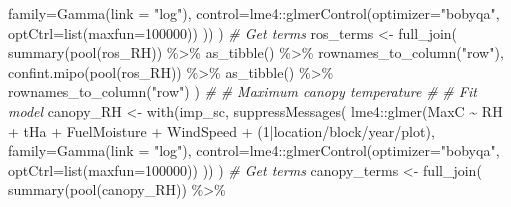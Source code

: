 \documentclass[
]{article}
\newenvironment{Shaded}{\begin{snugshade}}{\end{snugshade}}
\newcommand{\AttributeTok}[1]{\textcolor[rgb]{0.77,0.63,0.00}{#1}}
\newcommand{\CommentTok}[1]{\textcolor[rgb]{0.56,0.35,0.01}{\textit{#1}}}
\newcommand{\DecValTok}[1]{\textcolor[rgb]{0.00,0.00,0.81}{#1}}
\newcommand{\FunctionTok}[1]{\textcolor[rgb]{0.00,0.00,0.00}{#1}}
\newcommand{\NormalTok}[1]{#1}
\newcommand{\OtherTok}[1]{\textcolor[rgb]{0.56,0.35,0.01}{#1}}
\newcommand{\SpecialCharTok}[1]{\textcolor[rgb]{0.00,0.00,0.00}{#1}}
\newcommand{\StringTok}[1]{\textcolor[rgb]{0.31,0.60,0.02}{#1}}
\begin{document}
\begin{Shaded}
\begin{Highlighting}[]
                        \AttributeTok{family=}\FunctionTok{Gamma}\NormalTok{(}\AttributeTok{link =} \StringTok{"log"}\NormalTok{), }
                        \AttributeTok{control=}\NormalTok{lme4}\SpecialCharTok{::}\FunctionTok{glmerControl}\NormalTok{(}\AttributeTok{optimizer=}\StringTok{"bobyqa"}\NormalTok{, }
                                      \AttributeTok{optCtrl=}\FunctionTok{list}\NormalTok{(}\AttributeTok{maxfun=}\DecValTok{100000}\NormalTok{)) )) )}
  \CommentTok{\# Get terms}
\NormalTok{    ros\_terms }\OtherTok{\textless{}{-}} 
      \FunctionTok{full\_join}\NormalTok{(}
      \FunctionTok{summary}\NormalTok{(}\FunctionTok{pool}\NormalTok{(ros\_RH)) }\SpecialCharTok{\%\textgreater{}\%} 
        \FunctionTok{as\_tibble}\NormalTok{() }\SpecialCharTok{\%\textgreater{}\%}
        \FunctionTok{rownames\_to\_column}\NormalTok{(}\StringTok{"row"}\NormalTok{), }
      \FunctionTok{confint.mipo}\NormalTok{(}\FunctionTok{pool}\NormalTok{(ros\_RH)) }\SpecialCharTok{\%\textgreater{}\%}
        \FunctionTok{as\_tibble}\NormalTok{() }\SpecialCharTok{\%\textgreater{}\%}
        \FunctionTok{rownames\_to\_column}\NormalTok{(}\StringTok{"row"}\NormalTok{) ) }
\CommentTok{\#    }
\CommentTok{\# Maximum canopy temperature  }
\CommentTok{\#}
  \CommentTok{\# Fit model}
\NormalTok{    canopy\_RH }\OtherTok{\textless{}{-}} 
      \FunctionTok{with}\NormalTok{(imp\_sc, }\FunctionTok{suppressMessages}\NormalTok{(}
\NormalTok{            lme4}\SpecialCharTok{::}\FunctionTok{glmer}\NormalTok{(MaxC }\SpecialCharTok{\textasciitilde{}}\NormalTok{ RH }\SpecialCharTok{+}\NormalTok{ tHa }\SpecialCharTok{+}
\NormalTok{                            FuelMoisture }\SpecialCharTok{+}\NormalTok{ WindSpeed }\SpecialCharTok{+}
\NormalTok{                          (}\DecValTok{1}\SpecialCharTok{|}\NormalTok{location}\SpecialCharTok{/}\NormalTok{block}\SpecialCharTok{/}\NormalTok{year}\SpecialCharTok{/}\NormalTok{plot), }
                        \AttributeTok{family=}\FunctionTok{Gamma}\NormalTok{(}\AttributeTok{link =} \StringTok{"log"}\NormalTok{), }
                        \AttributeTok{control=}\NormalTok{lme4}\SpecialCharTok{::}\FunctionTok{glmerControl}\NormalTok{(}\AttributeTok{optimizer=}\StringTok{"bobyqa"}\NormalTok{, }
                                      \AttributeTok{optCtrl=}\FunctionTok{list}\NormalTok{(}\AttributeTok{maxfun=}\DecValTok{100000}\NormalTok{)) )) )}
  \CommentTok{\# Get terms}
\NormalTok{    canopy\_terms }\OtherTok{\textless{}{-}} 
      \FunctionTok{full\_join}\NormalTok{(}
        \FunctionTok{summary}\NormalTok{(}\FunctionTok{pool}\NormalTok{(canopy\_RH)) }\SpecialCharTok{\%\textgreater{}\%} 

\end{Highlighting}
\end{Shaded}
\end{document}
